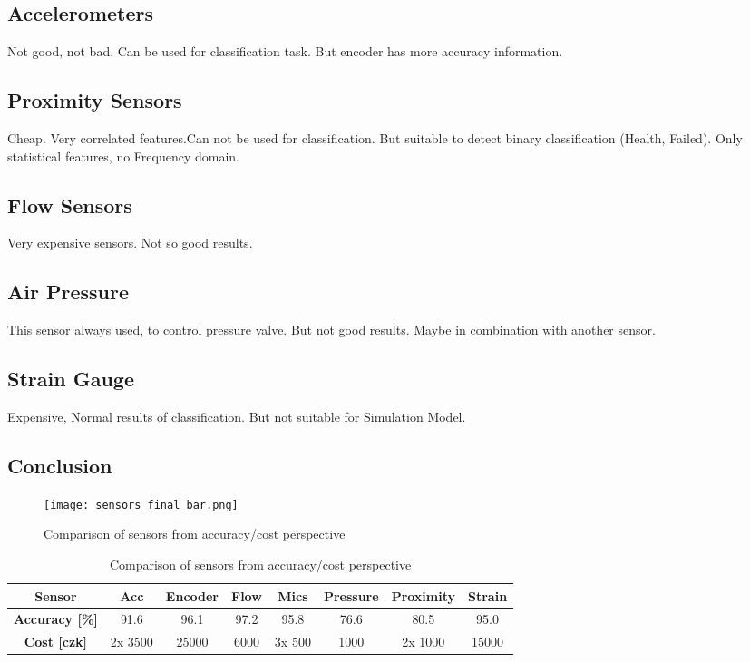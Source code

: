 \subsection{Accelerometers}
Not good, not bad. Can be used for classification task. But encoder has
more accuracy information.

\subsection{Proximity Sensors}
Cheap. Very correlated features.Can not be used for classification. But suitable
to detect binary classification (Health, Failed).
Only statistical features, no Frequency domain.

\subsection{Flow Sensors}
Very expensive sensors. Not so good results.

\subsection{Air Pressure}
This sensor always used, to control pressure valve. But not good results.
Maybe in combination with another sensor.

\subsection{Strain Gauge}
Expensive, Normal results of classification. But not suitable for
Simulation Model.


\subsection{Conclusion}

\begin{figure}[h!]
    \centering
    \texttt{[image: sensors\_final\_bar.png]}
    \caption{Comparison of sensors from accuracy/cost perspective}
    \label{fig:sensors_final_bar}
\end{figure}

\begin{table}[h]
    \centering
    \begin{tabular}{|c|c|c|c|c|c|c|c|}
        \hline
        \textbf{Sensor}   & Acc & Encoder & Flow & Mics & Pressure & Proximity & Strain \\
        \hline
        \textbf{Accuracy [\%]} & 91.6 & 96.1 & 97.2 & 95.8 & 76.6 & 80.5 & 95.0 \\
        \hline
        \textbf{Cost [czk]} & 2x 3500 & 25000 & 6000 & 3x 500 & 1000 & 2x 1000 & 15000 \\
        \hline
    \end{tabular}
    \caption{Comparison of sensors from accuracy/cost perspective}
    \label{tab:sensors_final}
\end{table}





